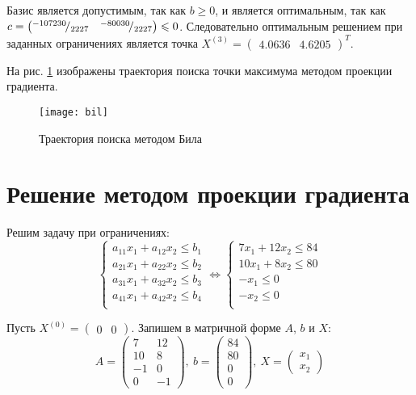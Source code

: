 Базис является допустимым, так как $b \geq 0$, и является оптимальным, так как $c = \begin{pmatrix} {}^{-107230}\!/_{2227} & {}^{-80030}\!/_{2227} \end{pmatrix} \leqslant 0$. Следовательно оптимальным решением при заданных ограничениях является точка $X^{(3)} = \begin{pmatrix} 4.0636 & 4.6205 \end{pmatrix}^T$.

На рис. \ref{fig:bil} изображены траектория поиска точки максимума методом проекции градиента.
\vspace{-0.5cm}
\begin{figure}[H]
\begin{center}
	\texttt{[image: bil]}
	\caption{Траектория поиска методом Била}
	\label{fig:bil}
\end{center}
\end{figure}

\section{Решение методом проекции градиента}

Решим задачу при ограничениях:
\begin{equation*}
\begin{cases}
	a_{11} x_1 + a_{12} x_2 \leq b_1 \\
	a_{21} x_1 + a_{22} x_2 \leq b_2 \\
	a_{31} x_1 + a_{32} x_2 \leq b_3 \\
	a_{41} x_1 + a_{42} x_2 \leq b_4 \\
\end{cases}
\Longleftrightarrow
\begin{cases}
	7 x_1 + 12 x_2 \leq 84 \\
	10 x_1 + 8 x_2 \leq 80 \\
	-x_1 \leq 0 \\
	-x_2 \leq 0 \\
\end{cases}
\end{equation*}

Пусть $X^{(0)} = \begin{pmatrix} 0 & 0 \end{pmatrix}$. Запишем в матричной форме $A$, $b$ и $X$:
\begin{equation*}
A = \begin{pmatrix} 
	7 & 12 \\
	10 & 8 \\
	-1 & 0 \\
	0 & -1
\end{pmatrix},\ 
b = \begin{pmatrix} 
	84 \\
	80 \\
	0 \\
	0
\end{pmatrix}, \ 
X = \begin{pmatrix}
	x_1 \\
	x_2
\end{pmatrix}
\end{equation*}

